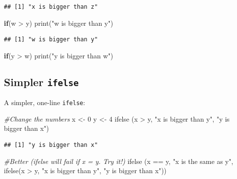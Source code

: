 \documentclass[
]{book}
\newenvironment{Shaded}{\begin{snugshade}}{\end{snugshade}}
\newcommand{\CommentTok}[1]{\textcolor[rgb]{0.56,0.35,0.01}{\textit{#1}}}
\newcommand{\ControlFlowTok}[1]{\textcolor[rgb]{0.13,0.29,0.53}{\textbf{#1}}}
\newcommand{\DecValTok}[1]{\textcolor[rgb]{0.00,0.00,0.81}{#1}}
\newcommand{\FunctionTok}[1]{\textcolor[rgb]{0.00,0.00,0.00}{#1}}
\newcommand{\NormalTok}[1]{#1}
\newcommand{\OtherTok}[1]{\textcolor[rgb]{0.56,0.35,0.01}{#1}}
\newcommand{\SpecialCharTok}[1]{\textcolor[rgb]{0.00,0.00,0.00}{#1}}
\newcommand{\StringTok}[1]{\textcolor[rgb]{0.31,0.60,0.02}{#1}}
\theoremstyle{definition}
\theoremstyle{definition}
\theoremstyle{definition}
\theoremstyle{definition}
\theoremstyle{remark}
\begin{document}
\begin{verbatim}
## [1] "x is bigger than z"
\end{verbatim}

\begin{Shaded}
\begin{Highlighting}[]
\ControlFlowTok{if}\NormalTok{(w }\SpecialCharTok{\textgreater{}}\NormalTok{ y) }\FunctionTok{print}\NormalTok{(}\StringTok{"w is bigger than y"}\NormalTok{)}
\end{Highlighting}
\end{Shaded}

\begin{verbatim}
## [1] "w is bigger than y"
\end{verbatim}

\begin{Shaded}
\begin{Highlighting}[]
\ControlFlowTok{if}\NormalTok{(y }\SpecialCharTok{\textgreater{}}\NormalTok{ w) }\FunctionTok{print}\NormalTok{(}\StringTok{"y is bigger than w"}\NormalTok{)}
\end{Highlighting}
\end{Shaded}

\hypertarget{simpler-ifelse}{%
\subsection{\texorpdfstring{Simpler \texttt{ifelse}}{Simpler ifelse}}\label{simpler-ifelse}}

A simpler, one-line \texttt{ifelse}:

\begin{Shaded}
\begin{Highlighting}[]
\CommentTok{\#Change the numbers}
\NormalTok{x }\OtherTok{\textless{}{-}} \DecValTok{0}
\NormalTok{y }\OtherTok{\textless{}{-}} \DecValTok{4}
\FunctionTok{ifelse}\NormalTok{ (x }\SpecialCharTok{\textgreater{}}\NormalTok{ y, }\StringTok{"x is bigger than y"}\NormalTok{, }\StringTok{"y is bigger than x"}\NormalTok{)}
\end{Highlighting}
\end{Shaded}

\begin{verbatim}
## [1] "y is bigger than x"
\end{verbatim}

\begin{Shaded}
\begin{Highlighting}[]
\CommentTok{\#Better (ifelse will fail if x = y.  Try it!)}
\FunctionTok{ifelse}\NormalTok{ (x }\SpecialCharTok{==}\NormalTok{ y, }\StringTok{"x is the same as y"}\NormalTok{,}
        \FunctionTok{ifelse}\NormalTok{(x }\SpecialCharTok{\textgreater{}}\NormalTok{ y, }\StringTok{"x is bigger than y"}\NormalTok{, }\StringTok{"y is bigger than x"}\NormalTok{))}
\end{Highlighting}
\end{Shaded}
\end{document}
